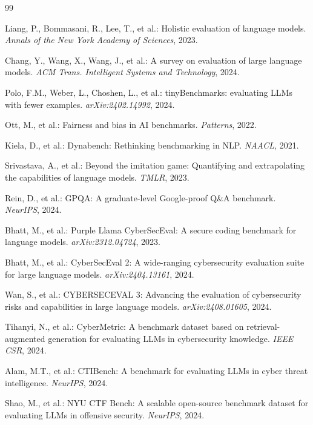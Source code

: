 \documentclass[journal]{IEEEtran}
\begin{document}
\begin{thebibliography}{99}

Liang, P., Bommasani, R., Lee, T., et al.: Holistic evaluation of language models. \emph{Annals of the New York Academy of Sciences}, 2023.

Chang, Y., Wang, X., Wang, J., et al.: A survey on evaluation of large language models. \emph{ACM Trans. Intelligent Systems and Technology}, 2024.

Polo, F.M., Weber, L., Choshen, L., et al.: tinyBenchmarks: evaluating LLMs with fewer examples. \emph{arXiv:2402.14992}, 2024.

Ott, M., et al.: Fairness and bias in AI benchmarks. \emph{Patterns}, 2022.

Kiela, D., et al.: Dynabench: Rethinking benchmarking in NLP. \emph{NAACL}, 2021.

Srivastava, A., et al.: Beyond the imitation game: Quantifying and extrapolating the capabilities of language models. \emph{TMLR}, 2023.

Rein, D., et al.: GPQA: A graduate-level Google-proof Q\&A benchmark. \emph{NeurIPS}, 2024.

Bhatt, M., et al.: Purple Llama CyberSecEval: A secure coding benchmark for language models. \emph{arXiv:2312.04724}, 2023.

Bhatt, M., et al.: CyberSecEval 2: A wide-ranging cybersecurity evaluation suite for large language models. \emph{arXiv:2404.13161}, 2024.

Wan, S., et al.: CYBERSECEVAL 3: Advancing the evaluation of cybersecurity risks and capabilities in large language models. \emph{arXiv:2408.01605}, 2024.

Tihanyi, N., et al.: CyberMetric: A benchmark dataset based on retrieval-augmented generation for evaluating LLMs in cybersecurity knowledge. \emph{IEEE CSR}, 2024.

Alam, M.T., et al.: CTIBench: A benchmark for evaluating LLMs in cyber threat intelligence. \emph{NeurIPS}, 2024.

Shao, M., et al.: NYU CTF Bench: A scalable open-source benchmark dataset for evaluating LLMs in offensive security. \emph{NeurIPS}, 2024.


\end{thebibliography}
\end{document}
